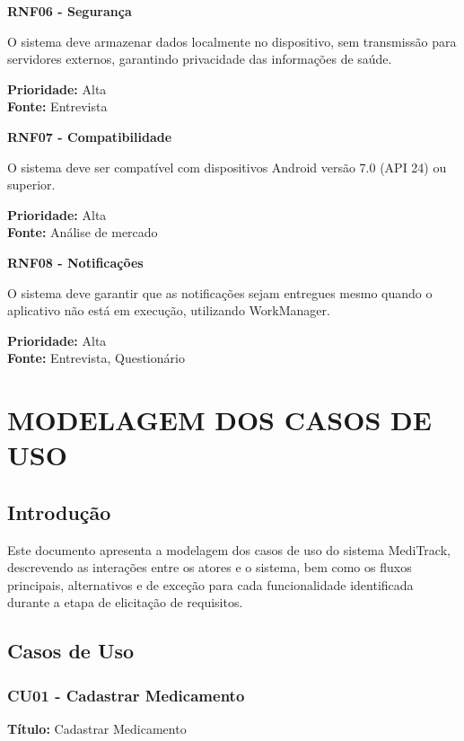 \documentclass[12pt]{article}
\begin{document}
\textbf{RNF06 - Segurança}

O sistema deve armazenar dados localmente no dispositivo, sem transmissão para servidores externos, garantindo privacidade das informações de saúde.

\textbf{Prioridade:} Alta \\
\textbf{Fonte:} Entrevista

\textbf{RNF07 - Compatibilidade}

O sistema deve ser compatível com dispositivos Android versão 7.0 (API 24) ou superior.

\textbf{Prioridade:} Alta \\
\textbf{Fonte:} Análise de mercado

\textbf{RNF08 - Notificações}

O sistema deve garantir que as notificações sejam entregues mesmo quando o aplicativo não está em execução, utilizando WorkManager.

\textbf{Prioridade:} Alta \\
\textbf{Fonte:} Entrevista, Questionário

\newpage

\section{MODELAGEM DOS CASOS DE USO}

\subsection{Introdução}

Este documento apresenta a modelagem dos casos de uso do sistema MediTrack, descrevendo as interações entre os atores e o sistema, bem como os fluxos principais, alternativos e de exceção para cada funcionalidade identificada durante a etapa de elicitação de requisitos.

\subsection{Casos de Uso}

\subsubsection{CU01 - Cadastrar Medicamento}

\textbf{Título:} Cadastrar Medicamento
\end{document}

